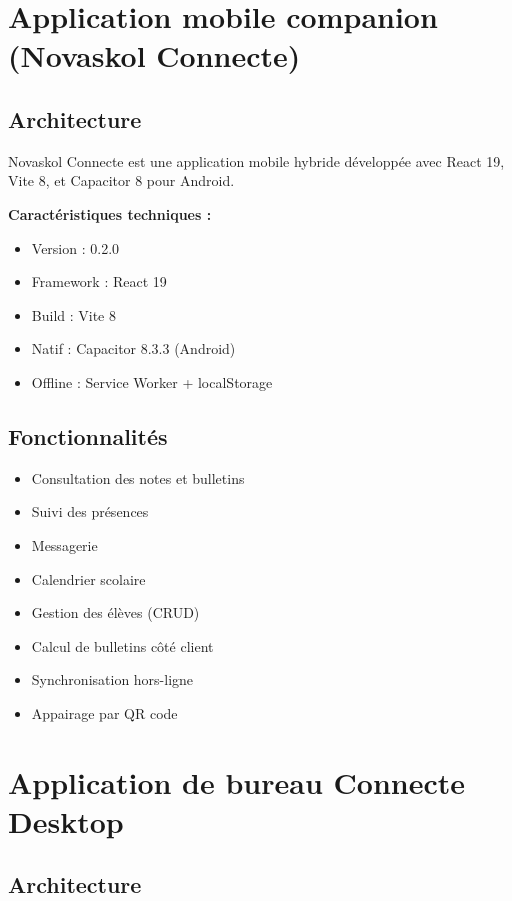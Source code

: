 \documentclass[12pt,a4paper,twoside]{report}
\begin{document}
\section{Application mobile companion (Novaskol Connecte)}

\subsection{Architecture}

Novaskol Connecte est une application mobile hybride développée avec React 19, Vite 8, et Capacitor 8 pour Android.

\textbf{Caractéristiques techniques :}
\begin{itemize}
    \item Version : 0.2.0
    \item Framework : React 19
    \item Build : Vite 8
    \item Natif : Capacitor 8.3.3 (Android)
    \item Offline : Service Worker + localStorage
\end{itemize}

\subsection{Fonctionnalités}

\begin{itemize}
    \item Consultation des notes et bulletins
    \item Suivi des présences
    \item Messagerie
    \item Calendrier scolaire
    \item Gestion des élèves (CRUD)
    \item Calcul de bulletins côté client
    \item Synchronisation hors-ligne
    \item Appairage par QR code
\end{itemize}

\section{Application de bureau Connecte Desktop}

\subsection{Architecture}
\end{document}
